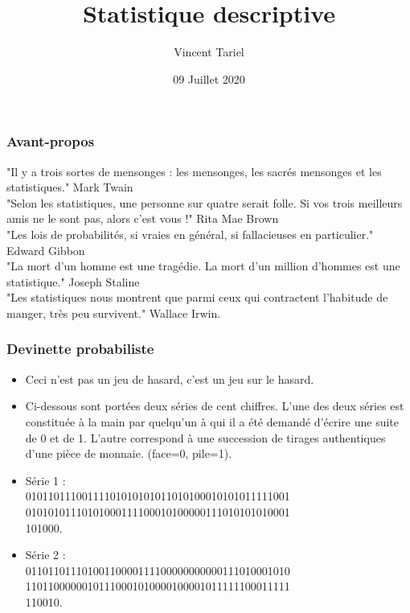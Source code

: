 \documentclass[10pt, french]{beamer}
\begin{document}
\title{Statistique descriptive}
\author{Vincent Tariel}
\date{09 Juillet 2020}
\begin{frame}
\titlepage
\end{frame}

\begin{frame}\frametitle{Avant-propos}
"Il y a trois sortes de mensonges : les mensonges, les sacrés mensonges et les statistiques."
Mark Twain\\
"Selon les statistiques, une personne sur quatre serait folle. Si vos trois meilleurs amis
ne le sont pas, alors c’est vous !" Rita Mae Brown \\
"Les lois de probabilités, si vraies en général,
si fallacieuses en particulier." Edward Gibbon \\
"La mort d’un homme est une tragédie. La
mort d’un million d’hommes est une
statistique." Joseph Staline\\
"Les statistiques nous montrent que parmi
ceux qui contractent l'habitude de manger,
très peu survivent." Wallace Irwin.
\end{frame}
\begin{frame}\frametitle{Devinette probabiliste}
\begin{itemize}
\item Ceci n’est pas un jeu de hasard, c’est un jeu sur le hasard.
\item Ci-dessous sont portées deux séries de cent chiffres. L’une
des deux séries est constituée à la main par quelqu’un à qui
il a été demandé d’écrire une suite de 0 et de 1. L’autre
correspond à une succession de tirages authentiques d’une
pièce de monnaie. (face=0, pile=1).
\item Série 1 :\\
01011011100111101010101011010100010101011111001\\
01010101110101000111100010100000111010101010001\\
101000.
\item Série 2 :\\
01101101110100110000111100000000000111010001010\\
11011000000101110001010000100001011111100011111\\
110010.
\end{itemize}
\end{frame}
\end{document}
